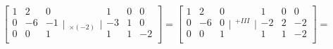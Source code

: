 $$
\left[
\begin{array}{rrr}
  1 & 2 &  0 \\
  0 & -6 & -1 \\
  0 & 0 & 1 \\
\end{array} \Bigg|
\begin{array}{l}
  _{} \\
  _{} \\
  _{\times (-2) } \\
\end{array}
\Bigg| \begin{array}{rrr}
  1 & 0 & 0 \\
 -3 & 1 & 0 \\
  1 & 1 & -2 \\
\end{array} \right] =\left[
\begin{array}{rrr}
  1 & 2 &  0 \\
  0 & -6 & 0 \\
  0 & 0 & 1 \\
\end{array} \Bigg|
\begin{array}{l}
  _{} \\
  _{+ III } \\
  _{} \\
\end{array}
\Bigg| \begin{array}{rrr}
  1 & 0 & 0 \\
  -2 & 2 & -2 \\
  1 & 1 & -2 \\
\end{array} \right] =
$$

